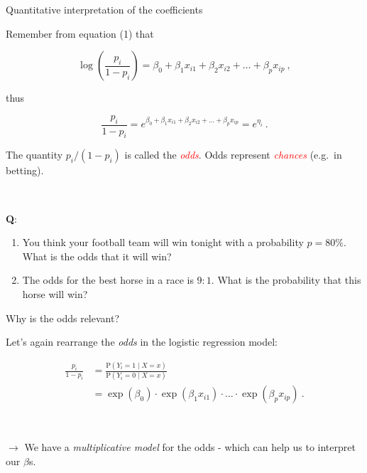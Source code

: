 \documentclass[10pt,ignorenonframetext,]{beamer}
\begin{document}
\begin{frame}

\begin{block}{Quantitative interpretation of the coefficients}

\vspace{2mm} Remember from equation (1) that

\begin{equation*}
\log\left( \frac{p_i}{1-p_i} \right) = \beta_0 + \beta_1 x_{i1} + \beta_2 x_{i2} + \ldots + \beta_p x_{ip} \ ,
\end{equation*}

thus

\begin{equation*}
 \frac{p_i}{1-p_i} = e^{\beta_0 + \beta_1 x_{i1} + \beta_2 x_{i2} + \ldots + \beta_p x_{ip}} = e^{\eta_i} \ .
\end{equation*}

\vspace{2mm}

The quantity \(p_i/(1-p_i)\) is called the \emph{\textcolor{red}{odds}}.
Odds represent \emph{\textcolor{red}{chances}} (e.g.~in betting).

\(~\)

\textbf{Q}:

\begin{enumerate}
\def\labelenumi{\arabic{enumi}.}
\item
  You think your football team will win tonight with a probability
  \(p=80\%\). What is the odds that it will win?
\item
  The odds for the best horse in a race is \(9:1\). What is the
  probability that this horse will win?
\end{enumerate}

\end{block}

\end{frame}

\begin{frame}

\begin{block}{Why is the odds relevant?}

\vspace{2mm} Let's again rearrange the \emph{odds} in the logistic
regression model:

\begin{align*}
 \frac{p_i}{1-p_i} &=  \frac{\text{P}(Y_i=1 \mid X=x)}{\text{P}(Y_i=0 \mid X = x)} \\[2mm]
 &= \exp(\beta_0) \cdot \exp(\beta_1 x_{i1}) \cdot \ldots \cdot  \exp(\beta_p x_{ip}) \ .
 \end{align*}

\(~\)

\(\rightarrow\) We have a \emph{multiplicative model} for the odds -
which can help us to interpret our \(\beta\)s.

\end{block}

\end{frame}
\end{document}
